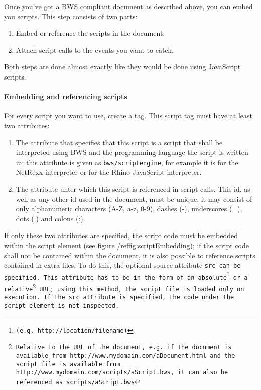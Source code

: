 Once you've got a BWS compliant document as described above, you can embed you scripts. This step consists of two parts: 

\begin{enumerate}

\item Embed or reference the scripts in the document.

\item Attach script calls to the events you want to catch.

\end{enumerate}

Both steps are done almost exactly like they would be done using JavaScript scripts.

\paragraph{Embedding and referencing scripts}

For every script you want to use, create a  tag. This script tag must have at least two attributes:

\begin{enumerate}

\item The  attribute that specifies that this script is a script that shall be interpreted using BWS and the programming language the script is written in; this attribute is given as \texttt{bws/scriptengine}, for example it is  for the NetRexx interpreter or  for the Rhino JavaScript interpreter.

\item The  attribute unter which this script is referenced in script calls. This id, as well as any other id used in the document, must be unique, it may consist of only alphanumeric characters (A-Z, a-z, 0-9), dashes (-), underscores (\_), dots (.) and colons (:).

\end{enumerate}

If only these two attributes are specified, the script code must be embedded within the script element (see figure /ref{fig:scriptEmbedding}); if the script code shall not be contained within the document, it is also possible to reference scripts contained in extra files. To do this, the optional source attribute \tt{src} can be specified. This attribute has to be in the form of an absolute\footnote{(e.g. \tt{http://location/filename})} or a relative\footnote{Relative to the URL of the document, e.g. if the document is available from http://www.mydomain.com/aDocument.html and the script file is available from \tt{http://www.mydomain.com/scripts/aScript.bws}, it can also be referenced as \tt{scripts/aScript.bws}} URL; using this method, the script file is loaded only on execution. If the \tt{src} attribute is specified, the code under the script element is not inspected.

